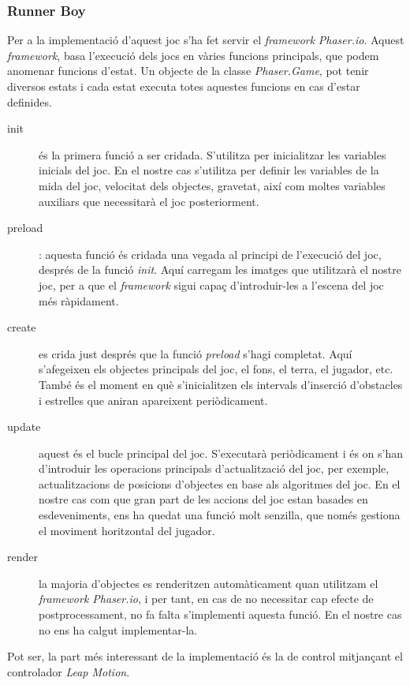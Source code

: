 \documentclass[12pt,a4paper,catalan]{article}
\begin{document}
	\subsubsection{Runner Boy}
	Per a la implementació d'aquest joc s'ha fet servir el \textit{framework} \textit{Phaser.io}. Aquest \textit{framework}, basa l'execució dels jocs en vàries funcions principals, que podem anomenar funcions d'estat. Un objecte de la classe \textit{Phaser.Game}, pot tenir diversos estats i cada estat executa totes aquestes funcions en cas d'estar definides.
	\begin{description}
		\item[init] és la primera funció a ser cridada. S'utilitza per inicialitzar les variables inicials del joc. En el nostre cas s'utilitza per definir les variables de la mida del joc, velocitat dels objectes, gravetat, així com moltes variables auxiliars que necessitarà el joc posteriorment.
		\item[preload]: aquesta funció és cridada una vegada al principi de l'execució del joc, després de la funció \textit{init}. Aquí carregam les imatges que utilitzarà el nostre joc, per a que el \textit{framework} sigui capaç d'introduir-les a l'escena del joc més ràpidament.
		\item[create] es crida just després que la funció \textit{preload} s'hagi completat. Aquí s'afegeixen els objectes principals del joc, el fons, el terra, el jugador, etc. També és el moment en què s'inicialitzen els intervals d'inserció d'obstacles i estrelles que aniran apareixent periòdicament.
		\item[update] aquest és el bucle principal del joc. S'executarà periòdicament i és on s'han d'introduir les operacions principals d'actualització del joc, per exemple, actualitzacions de posicions d'objectes en base als algoritmes del joc. En el nostre cas com que gran part de les accions del joc estan basades en esdeveniments, ens ha quedat una funció molt senzilla, que només gestiona el moviment horitzontal del jugador.
		\item[render] la majoria d'objectes es renderitzen automàticament quan utilitzam el \textit{framework Phaser.io}, i per tant, en cas de no necessitar cap efecte de postprocessament, no fa falta s'implementi aquesta funció. En el nostre cas no ens ha calgut implementar-la.
	\end{description}
	Pot ser, la part més interessant de la implementació és la de control mitjançant el controlador \textit{Leap Motion}.
	
\end{document}
